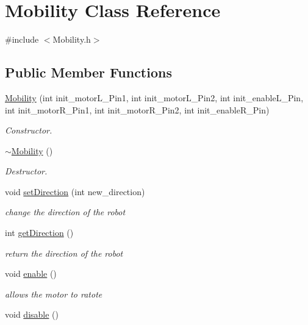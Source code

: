 \hypertarget{class_mobility}{}\section{Mobility Class Reference}
\label{class_mobility}


{\ttfamily \#include $<$Mobility.\+h$>$}

\subsection*{Public Member Functions}
\begin{DoxyCompactItemize}
\item 
\hyperlink{class_mobility_ab6cb1a6fd521e9442486cf38de1c5249}{Mobility} (int init\+\_\+motor\+L\+\_\+\+Pin1, int init\+\_\+motor\+L\+\_\+\+Pin2, int init\+\_\+enable\+L\+\_\+\+Pin, int init\+\_\+motor\+R\+\_\+\+Pin1, int init\+\_\+motor\+R\+\_\+\+Pin2, int init\+\_\+enable\+R\+\_\+\+Pin)
\begin{DoxyCompactList}\small\item\em Constructor. \end{DoxyCompactList}\item 
\hyperlink{class_mobility_ae4069466d32ea90d59ab5cdbf97177b6}{$\sim$\+Mobility} ()
\begin{DoxyCompactList}\small\item\em Destructor. \end{DoxyCompactList}\item 
void \hyperlink{class_mobility_a67abccf01ad4f50a3bd135a4f105cb6d}{set\+Direction} (int new\+\_\+direction)
\begin{DoxyCompactList}\small\item\em change the direction of the robot \end{DoxyCompactList}\item 
int \hyperlink{class_mobility_a88345203cab73996114673a780440048}{get\+Direction} ()
\begin{DoxyCompactList}\small\item\em return the direction of the robot \end{DoxyCompactList}\item 
void \hyperlink{class_mobility_a6bb0a09af7f98a5ea18d9752e277de26}{enable} ()
\begin{DoxyCompactList}\small\item\em allows the motor to ratote \end{DoxyCompactList}\item 
void \hyperlink{class_mobility_a9208362074642bb10b5868e7cc75395c}{disable} ()

\end{DoxyCompactItemize}
